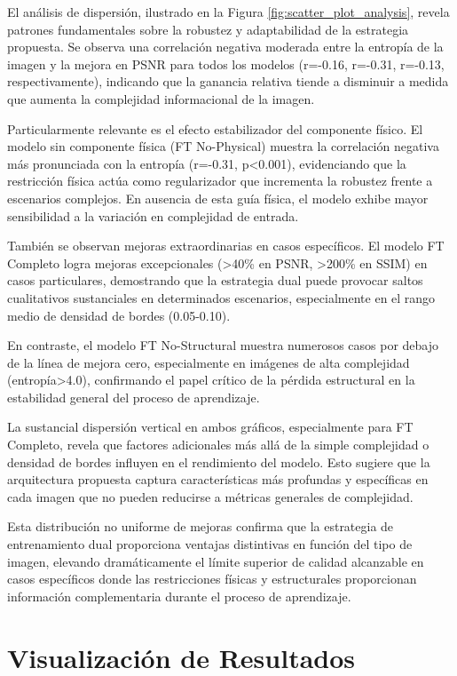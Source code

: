 El análisis de dispersión, ilustrado en la Figura \ref{fig:scatter_plot_analysis}, revela patrones fundamentales sobre la robustez y adaptabilidad de la estrategia propuesta. Se observa una correlación negativa moderada entre la entropía de la imagen y la mejora en PSNR para todos los modelos (r=-0.16, r=-0.31, r=-0.13, respectivamente), indicando que la ganancia relativa tiende a disminuir a medida que aumenta la complejidad informacional de la imagen.

Particularmente relevante es el efecto estabilizador del componente físico. El modelo sin componente física (FT No-Physical) muestra la correlación negativa más pronunciada con la entropía (r=-0.31, p<0.001), evidenciando que la restricción física actúa como regularizador que incrementa la robustez frente a escenarios complejos. En ausencia de esta guía física, el modelo exhibe mayor sensibilidad a la variación en complejidad de entrada.

También se observan mejoras extraordinarias en casos específicos. El modelo FT Completo logra mejoras excepcionales (>40\% en PSNR, >200\% en SSIM) en casos particulares, demostrando que la estrategia dual puede provocar saltos cualitativos sustanciales en determinados escenarios, especialmente en el rango medio de densidad de bordes (0.05-0.10).

En contraste, el modelo FT No-Structural muestra numerosos casos por debajo de la línea de mejora cero, especialmente en imágenes de alta complejidad (entropía>4.0), confirmando el papel crítico de la pérdida estructural en la estabilidad general del proceso de aprendizaje.

La sustancial dispersión vertical en ambos gráficos, especialmente para FT Completo, revela que factores adicionales más allá de la simple complejidad o densidad de bordes influyen en el rendimiento del modelo. Esto sugiere que la arquitectura propuesta captura características más profundas y específicas en cada imagen que no pueden reducirse a métricas generales de complejidad.

Esta distribución no uniforme de mejoras confirma que la estrategia de entrenamiento dual proporciona ventajas distintivas en función del tipo de imagen, elevando dramáticamente el límite superior de calidad alcanzable en casos específicos donde las restricciones físicas y estructurales proporcionan información complementaria durante el proceso de aprendizaje.

\section{Visualización de Resultados}

